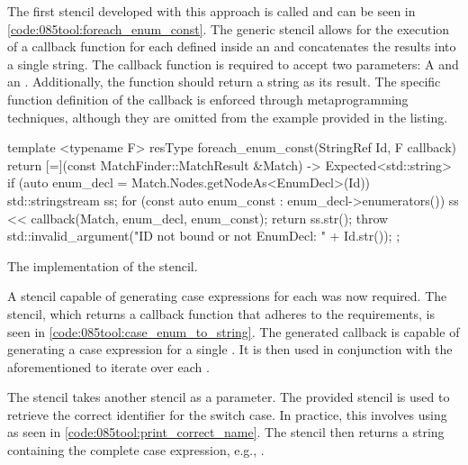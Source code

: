 The first stencil developed with this approach is called  and can be seen in \cref{code:085tool:foreach_enum_const}.
The generic stencil allows for the execution of a callback function for each  defined inside an  and concatenates the results into a single string.
The callback function is required to accept two parameters: A  and an . Additionally, the function should return a string as its result.
The specific function definition of the callback is enforced through metaprogramming techniques, although they are omitted from the example provided in the listing.

\begin{listing}[H]
    \begin{cppcode}
template <typename F>
resType foreach_enum_const(StringRef Id, F callback) {
	return [=](const MatchFinder::MatchResult &Match) -> Expected<std::string> {
		if (auto enum_decl = Match.Nodes.getNodeAs<EnumDecl>(Id)) {
			std::stringstream ss;
			for (const auto enum_const : enum_decl->enumerators()) {
				ss << callback(Match, enum_decl, enum_const);
			}
			return ss.str();
		}
		throw std::invalid_argument("ID not bound or not EnumDecl: " + Id.str());
	};
}
    \end{cppcode}
    \caption{The implementation of the  stencil.}
    \label{code:085tool:foreach_enum_const}
\end{listing}

A stencil capable of generating case expressions for each  was now required.
The  stencil, which returns a callback function that adheres to the requirements, is seen in \cref{code:085tool:case_enum_to_string}.
The generated callback is capable of generating a case expression for a single . It is then used in conjunction with the aforementioned  to iterate over each .

The  stencil takes another stencil as a parameter. The provided stencil is used to retrieve the correct identifier for the switch case. In practice, this involves using  as seen in \cref{code:085tool:print_correct_name}.
The stencil then returns a string containing the complete case expression, e.g., .

